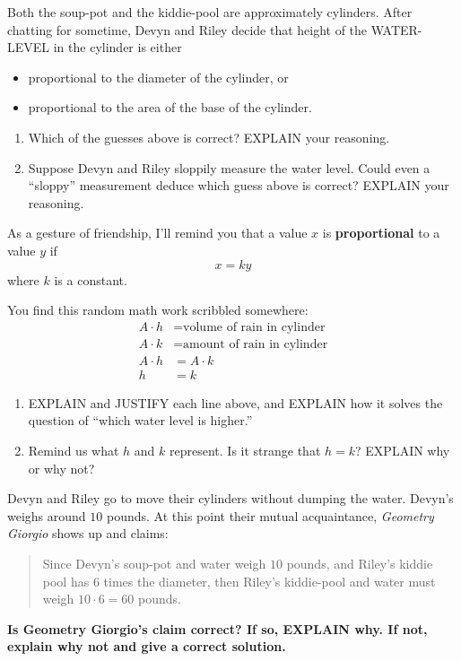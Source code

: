 \documentclass[nooutcomes,noauthor,hints,handout]{ximera}
\begin{document}
\begin{question}
  Both the soup-pot and the kiddie-pool are approximately cylinders.
  After chatting for sometime, Devyn and Riley decide that height of
  the WATER-LEVEL in the cylinder is either
  \begin{itemize}
  \item proportional to the diameter of the cylinder, or
  \item proportional to the area of the base of the cylinder.
  \end{itemize}
  \begin{enumerate}
  \item Which of the guesses above is correct? EXPLAIN your reasoning.
  \item Suppose Devyn and Riley sloppily measure the water level. Could
    even a ``sloppy'' measurement deduce which guess above is correct?
    EXPLAIN your reasoning.
  \end{enumerate}
  As a gesture of friendship, I'll remind you that a value $x$ is \textbf{proportional} to a value $y$ if
  \[
  x = k y
  \]
  where $k$ is a constant.
\end{question}
\mynewpage



\begin{question}
  You find this random math work scribbled somewhere:
  \begin{align}
    A \cdot h &= \text{volume of rain in cylinder}\\
    A \cdot k &= \text{amount of rain in cylinder}\\
    A\cdot h &= A\cdot k\\
    h &= k
  \end{align}
  \begin{enumerate}
  \item EXPLAIN and JUSTIFY each line above, and EXPLAIN how it solves
    the question of ``which water level is higher.''
  \item Remind us what $h$ and $k$ represent. Is it strange that
    $h=k$? EXPLAIN why or why not?
  \end{enumerate}
\end{question}
\mynewpage


\begin{question}
  Devyn and Riley go to move their cylinders without dumping the
  water. Devyn's weighs around $10$ pounds. At this point their mutual
  acquaintance, \textit{Geometry Giorgio} shows up and claims:
  \begin{quote}
    Since Devyn's soup-pot and water weigh $10$ pounds, and Riley's
    kiddie pool has $6$ times the diameter, then Riley's kiddie-pool
    and water must weigh $10\cdot 6 = 60$ pounds.
  \end{quote}
  \textbf{Is Geometry Giorgio’s claim correct?  If so, EXPLAIN why. If
    not, explain why not and give a correct solution.}
\end{question}
\end{document}
